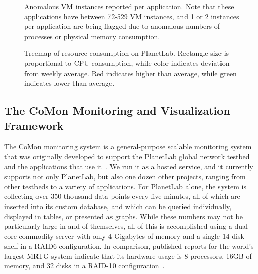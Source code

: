 \begin{figure*}[t]
\begin{minipage}[t]{3.5in}
\caption{Anomalous VM instances reported per application. Note that
these applications have between 72-529 VM instances, and 1 or 2 instances
per application are being flagged due to anomalous numbers of processes
or physical memory consumption.}
\label{fig_comon_anomaly}
\end{minipage}
\hspace{.25in}
\begin{minipage}[t]{2.75in}
\caption{Treemap of resource consumption on PlanetLab. Rectangle size
is proportional to CPU consumption, while color indicates deviation
from weekly average. Red indicates higher than average, while green
indicates lower than average.}
\label{fig_comon_treemap}
\end{minipage}
\end{figure*}

\subsection{The CoMon Monitoring and Visualization Framework}

The CoMon monitoring system is a general-purpose scalable monitoring
system that was originally developed to support the PlanetLab global
network testbed and the applications that use it~\cite{CoMon}. We run
it as a hosted service, and it currently supports not only PlanetLab,
but also one dozen other projects, ranging from other testbeds to a
variety of applications. For PlanetLab alone, the system is collecting
over 350 thousand data points every five minutes, all of which are
inserted into its custom database, and which can be queried
individually, displayed in tables, or presented as graphs. While these
numbers may not be particularly large in and of themselves, all of this
is accomplished using a dual-core commodity server with only 4
Gigabytes of memory and a single 14-disk shelf in a RAID6
configuration. In comparison, published reports for the world's
largest MRTG system indicate that its hardware usage is 8 processors,
16GB of memory, and 32 disks in a RAID-10 configuration~\cite{Plonka}.



